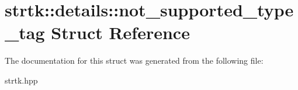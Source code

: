 \hypertarget{structstrtk_1_1details_1_1not__supported__type__tag}{\section{strtk\-:\-:details\-:\-:not\-\_\-supported\-\_\-type\-\_\-tag Struct Reference}
\label{structstrtk_1_1details_1_1not__supported__type__tag}
}


The documentation for this struct was generated from the following file\-:\begin{DoxyCompactItemize}
\item 
strtk.\-hpp\end{DoxyCompactItemize}
